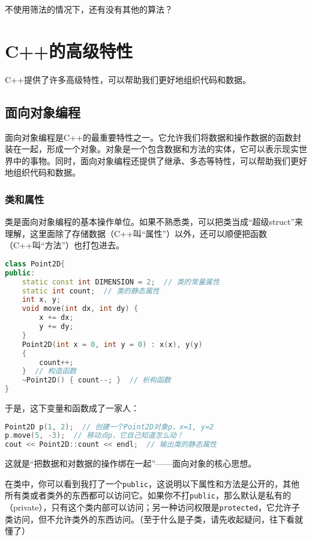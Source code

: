 \begin{exercise}
  不使用筛法的情况下，还有没有其他的算法？
\end{exercise}

\section{C++的高级特性}
C++提供了许多高级特性，可以帮助我们更好地组织代码和数据。

\subsection{面向对象编程}

面向对象编程是C++的最重要特性之一。它允许我们将数据和操作数据的函数封装在一起，形成一个对象。对象是一个包含数据和方法的实体，它可以表示现实世界中的事物。同时，面向对象编程还提供了继承、多态等特性，可以帮助我们更好地组织代码和数据。

\subsubsection{类和属性}

类是面向对象编程的基本操作单位。如果不熟悉类，可以把类当成“超级struct”来理解，这里面除了存储数据（C++叫“属性”）以外，还可以顺便把函数（C++叫“方法”）也打包进去。
\begin{lstlisting}[language=C++]
class Point2D{
public:
    static const int DIMENSION = 2;  // 类的常量属性
    static int count;  // 类的静态属性
    int x, y;
    void move(int dx, int dy) {
        x += dx;
        y += dy;
    }
    Point2D(int x = 0, int y = 0) : x(x), y(y)
    {
        count++;
    }  // 构造函数
    ~Point2D() { count--; }  // 析构函数
}
\end{lstlisting}
于是，这下变量和函数成了一家人：
\begin{lstlisting}[language=C++]
Point2D p(1, 2);  // 创建一个Point2D对象p，x=1, y=2
p.move(5, -3);  // 移动点p，它自己知道怎么动！
cout << Point2D::count << endl;  // 输出类的静态属性
\end{lstlisting}
这就是“把数据和对数据的操作绑在一起”——面向对象的核心思想。

在类中，你可以看到我打了一个\texttt{public}，这说明以下属性和方法是公开的，其他所有类或者类外的东西都可以访问它。如果你不打\texttt{public}，那么默认是私有的（private），只有这个类内部可以访问；另一种访问权限是\texttt{protected}，它允许子类访问，但不允许类外的东西访问。（至于什么是子类，请先收起疑问，往下看就懂了）

